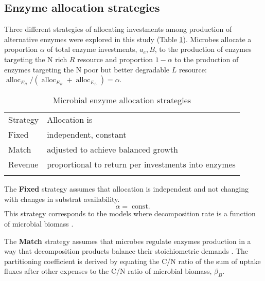 \subsection{ Enzyme allocation strategies} 
\label{sec:AllocStrategies}

Three different strategies of allocating investments among production of
alternative enzymes were explored in this study (Table
\ref{tab:AllocStrategies}). Microbes allocate a proportion $\alpha$ of total
enzyme investments, $a_e, B$, to the production of enzymes targeting the N rich
$R$ resource and proportion $1 - \alpha$ to the production of enzymes targeting
the N poor but better degradable $L$ resource: $\operatorname{alloc}_{E_R} /
(\operatorname{alloc}_{E_R} + \operatorname{alloc}_{E_L}) = \alpha$.

\begin{table}[t]
\caption{Microbial enzyme allocation strategies \label{tab:AllocStrategies}}
\vskip4mm
\centering
\begin{tabular}{ll}
\tophline
Strategy &  Allocation is \\
\middlehline
Fixed & independent, constant \\
Match & adjusted to achieve balanced growth \\
Revenue & proportional to return per investments into enzymes \\
\bottomhline
\end{tabular}
\end{table}


The \textbf{Fixed} strategy assumes that allocation is independent
and not changing with changes in substrat availability.
\begin{equation} 
\label{eq:allocFixed}
\alpha = \operatorname{const.}
\end{equation}
This strategy corresponds to the models where decomposition rate is a function
of microbial biomass \citep{Wutzler08}.
 
The \textbf{Match} strategy assumes that microbes regulate enzymes production in
a way that decomposition products balance their stoichiometric demands
\citep{Moorhead12}.
The partitioning coefficient is derived by equating the C/N ratio of the sum of
uptake fluxes after other expenses to the C/N ratio of microbial biomass,
$\beta_B$.

